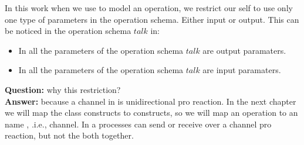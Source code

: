 In this work when we use \oz{} to model an operation, we restrict our self to use only one type of parameters in the operation schema. Either input or output. This can be noticed in the operation schema $talk$ in:
\begin{itemize}
\item In  all the parameters of the operation schema $talk$ are output paramaters.
\item In   all the parameters of the operation schema $talk$ are input paramaters.
\end{itemize}
\textbf{Question:} why this restriction?\\
\textbf{Answer:} because a channel in \picalc{} is unidirectional pro reaction. In the next chapter we will map the \oz{} class constructs to  \picalc{} constructs, so we will map an \oz{} operation to an \picalc{} name , .i.e., channel. In \picalc{} a processes can send or receive over a channel pro reaction, but not the both together.